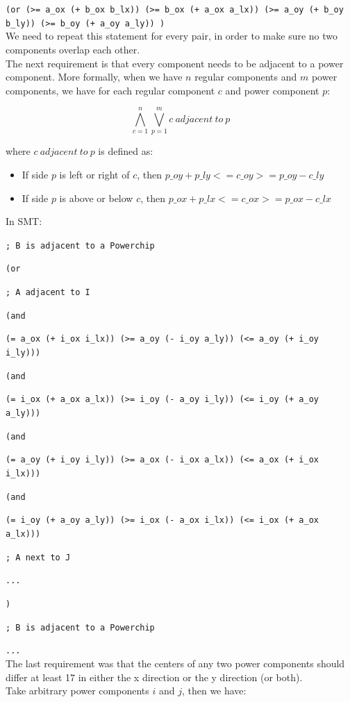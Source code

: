 \documentclass[a4paper]{article}
\begin{document}
	{\tt (or (>= a\_ox (+ b\_ox b\_lx)) (>= b\_ox (+ a\_ox a\_lx)) (>= a\_oy (+ b\_oy b\_ly)) (>= b\_oy (+ a\_oy a\_ly)) )}\\
	\noindent We need to repeat this statement for every pair, in order to make sure no two components overlap each other.\\
	
	\noindent The next requirement is that every component needs to be adjacent to a power component. More formally, when we have $n$ regular components and $m$ power components, we have for each regular component $c$ and power component $p$:
	
	$$\bigwedge_{c=1}^n \bigvee_{p=1}^m c\ adjacent\ to\ p $$
	
	\noindent where $c\ adjacent\ to\ p $ is defined as:
	\begin{itemize}
	\item If side $p$ is left or right of $c$, then $p\_oy + p\_ly <= c\_oy >= p\_oy - c\_ly$
	\item If side $p$ is above or below $c$, then $p\_ox + p\_lx <= c\_ox >= p\_ox - c\_lx$
	\end{itemize}
	
	\noindent In SMT:
	
	{\tt ; B is adjacent to a Powerchip}
	
	{\tt (or}
	
	{\tt ; A adjacent to I}
	
	{\tt (and}
	
	{\tt (= a\_ox (+ i\_ox i\_lx)) (>= a\_oy (- i\_oy a\_ly)) (<= a\_oy (+ i\_oy i\_ly)))}
	
	{\tt (and}
	
	{\tt (= i\_ox (+ a\_ox a\_lx)) (>= i\_oy (- a\_oy i\_ly)) (<= i\_oy (+ a\_oy a\_ly)))}
	
	{\tt (and }
	
	{\tt (= a\_oy (+ i\_oy i\_ly)) (>= a\_ox (- i\_ox a\_lx)) (<= a\_ox (+ i\_ox i\_lx)))}
	
	{\tt (and}
	
	{\tt (= i\_oy (+ a\_oy a\_ly)) (>= i\_ox (- a\_ox i\_lx)) (<= i\_ox (+ a\_ox a\_lx)))}
	
	{\tt ; A next to J}
	
	{\tt ...}
	
	{\tt )}

	{\tt ; B is adjacent to a Powerchip}

	{\tt ...}\\
	
	\noindent The last requirement was that the centers of any two power components should differ at least 17 in either the x direction or the y direction (or both).\\
	Take arbitrary power components $i$ and $j$, then we have:
	
\end{document}
